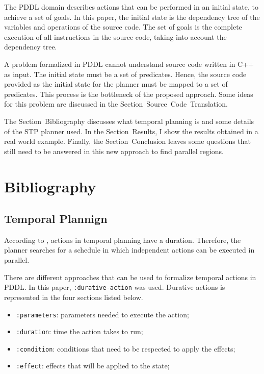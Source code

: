 \documentclass[letterpaper]{article}
\begin{document}
The PDDL domain describes actions that can be performed in an initial state, to achieve a set of goals. In this paper, the initial state is the dependency tree of the variables and operations of the source code. The set of goals is the complete execution of all instructions in the source code, taking into account the dependency tree.

A problem formalized in PDDL cannot understand source code written in C++ as input. The initial state must be a set of predicates. Hence, the source code provided as the initial state for the planner must be mapped to a set of predicates. This process is the bottleneck of the proposed approach. Some ideas for this problem are discussed in the Section~Source~Code~Translation.

The Section~Bibliography discusses what temporal planning is and some details of the STP planner used. In the Section~Results, I show the results obtained in a real world example. Finally, the Section~Conclusion leaves some questions that still need to be answered in this new approach to find parallel regions.


\section{Bibliography}

\subsection{Temporal Plannign} \label{label:temporal-planning}

According to \cite{DBLP:series/synthesis/2019Haslum}, actions in temporal planning have a duration. Therefore, the planner searches for a schedule in which independent actions can be executed in parallel.

There are different approaches that can be used to formalize temporal actions in PDDL. In this paper, \texttt{:durative-action} was used. Durative actions is represented in the four sections listed below.

\begin{itemize}
    \item \texttt{:parameters}: parameters needed to execute the action;
    \item \texttt{:duration}: time the action takes to run;
    \item \texttt{:condition}: conditions that need to be respected to apply the effects;
    \item \texttt{:effect}: effects that will be applied to the state;
\end{itemize}
\end{document}
